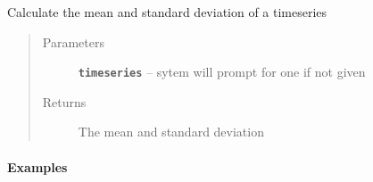\documentclass[letterpaper,10pt,english]{sphinxmanual}
\begin{document}
\begin{fulllineitems}
\label{Main:pyleoclim.statsTs}
Calculate the mean and standard deviation of a timeseries
\begin{quote}\begin{description}
\item[{Parameters}] \leavevmode
\textbf{\texttt{timeseries}} -- sytem will prompt for one if not given

\item[{Returns}] \leavevmode
The mean and standard deviation

\end{description}\end{quote}
\paragraph{Examples}


\end{fulllineitems}
\end{document}
